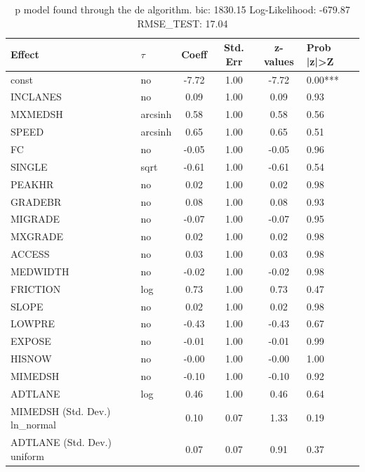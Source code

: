 \begin{table}
	\caption{p model found through the de algorithm. bic: 1830.15 Log-Likelihood: -679.87 RMSE_TEST: 17.04}
	\begin{center}
		\begin{tabular}{|l|l|c|c|c|l|}
			\hline
			Effect & $\tau$ & Coeff & Std. Err & z-values & Prob |z|>Z \\
			\hline
			const & no & -7.72 & 1.00 & -7.72 & 0.00*** \\
			\hline
			INCLANES & no & 0.09 & 1.00 & 0.09 & 0.93 \\
			\hline
			MXMEDSH & arcsinh & 0.58 & 1.00 & 0.58 & 0.56 \\
			\hline
			SPEED & arcsinh & 0.65 & 1.00 & 0.65 & 0.51 \\
			\hline
			FC & no & -0.05 & 1.00 & -0.05 & 0.96 \\
			\hline
			SINGLE & sqrt & -0.61 & 1.00 & -0.61 & 0.54 \\
			\hline
			PEAKHR & no & 0.02 & 1.00 & 0.02 & 0.98 \\
			\hline
			GRADEBR & no & 0.08 & 1.00 & 0.08 & 0.93 \\
			\hline
			MIGRADE & no & -0.07 & 1.00 & -0.07 & 0.95 \\
			\hline
			MXGRADE & no & 0.02 & 1.00 & 0.02 & 0.98 \\
			\hline
			ACCESS & no & 0.03 & 1.00 & 0.03 & 0.98 \\
			\hline
			MEDWIDTH & no & -0.02 & 1.00 & -0.02 & 0.98 \\
			\hline
			FRICTION & log & 0.73 & 1.00 & 0.73 & 0.47 \\
			\hline
			SLOPE & no & 0.02 & 1.00 & 0.02 & 0.98 \\
			\hline
			LOWPRE & no & -0.43 & 1.00 & -0.43 & 0.67 \\
			\hline
			EXPOSE & no & -0.01 & 1.00 & -0.01 & 0.99 \\
			\hline
			HISNOW & no & -0.00 & 1.00 & -0.00 & 1.00 \\
			\hline
			MIMEDSH & no & -0.10 & 1.00 & -0.10 & 0.92 \\
			\hline
			ADTLANE & log & 0.46 & 1.00 & 0.46 & 0.64 \\
			\hline
			MIMEDSH (Std. Dev.) ln_normal &  & 0.10 & 0.07 & 1.33 & 0.19 \\
			\hline
			ADTLANE (Std. Dev.) uniform &  & 0.07 & 0.07 & 0.91 & 0.37 \\
			\hline
		\end{tabular}
	\end{center}
\end{table}
